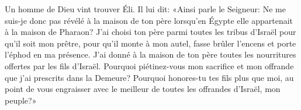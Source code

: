 Un homme de Dieu vint trouver Éli.
Il lui dit: «Ainsi parle le Seigneur:
	Ne me suis-je donc pas révélé à la maison de ton père
	lorsqu’en Égypte elle appartenait à la maison de Pharaon?
J’ai choisi ton père parmi toutes les tribus d’Israël pour qu’il soit mon prêtre,
	pour qu’il monte à mon autel, fasse brûler l’encens et porte l’éphod en ma présence.
J’ai donné à la maison de ton père toutes les nourritures offertes par les fils d’Israël.
Pourquoi piétinez-vous mon sacrifice et mon offrande
	que j’ai prescrits dans la Demeure?
Pourquoi honores-tu tes fils plus que moi,
	au point de vous engraisser
		avec le meilleur de toutes les offrandes d’Israël, mon peuple?»
